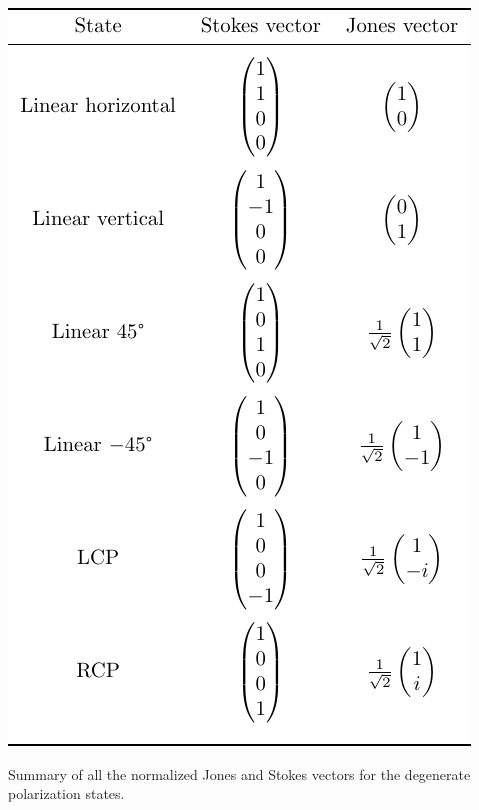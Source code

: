 \begin{table}[H]
    \centering
    \includegraphics[scale=1]{images/theory/pol_statevectors_table.pdf}
    \caption{Summary of all the normalized Jones and Stokes vectors for the degenerate polarization states.}
    \label{tab:pol_statevectors}
\end{table}




